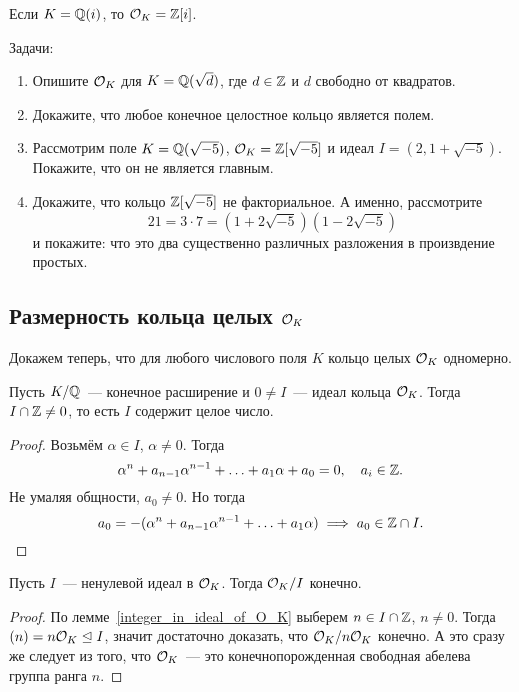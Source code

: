 	\begin{example}
		Если $K = \mathbb{Q}(i)$, то $\mathcal{O}_{K} = \mathbb{Z}[i]$.
	\end{example}

	\begin{homework}\label{hw_1}
		Задачи:
		\begin{enumerate}
			\item Опишите $\mathcal{O}_{K}$ для $K = \mathbb{Q}(\sqrt{d})$, где $d \in \mathbb{Z}$ и $d$ свободно от квадратов. 

			\item Докажите, что любое конечное целостное кольцо является полем. 

			\item Рассмотрим поле $K = \mathbb{Q}(\sqrt{-5})$, $\mathcal{O}_{K} = \mathbb{Z}[\sqrt{-5}]$ и идеал $I = (2, 1 + \sqrt{-5})$. Покажите, что он не является главным. 

			\item Докажите, что кольцо $\mathbb{Z}[\sqrt{-5}]$  не факториальное. А именно, рассмотрите
			\[
				21 = 3 \cdot 7 = (1 + 2\sqrt{-5})(1 - 2\sqrt{-5})
			\]
			и покажите: что это два существенно различных разложения в произвдение простых. 
		\end{enumerate}
	\end{homework}

	\subsection{Размерность кольца целых $\mathcal{O}_{K}$}

	Докажем теперь, что для любого числового поля $K$ кольцо целых $\mathcal{O}_{K}$ одномерно. 

	\begin{lemma}\label{integer_in_ideal_of_O_K} 
		Пусть $K/\mathbb{Q}$~--- конечное расширение и  $0 \neq I$~--- идеал кольца $\mathcal{O}_{K}$. Тогда $I \cap \mathbb{Z} \neq 0$, то есть $I$ содержит целое число. 
	\end{lemma}

	\begin{proof}
		Возьмём $\alpha \in I$, $\alpha \neq 0$. Тогда 
		\[
			\alpha^n + a_{n - 1} \alpha^{n - 1} + \ldots + a_{1}\alpha + a_0 = 0, \quad a_i \in \mathbb{Z}.
		\]
		Не умаляя общности, $a_0 \neq 0$. Но тогда 
		\[
			a_0 = - (\alpha^n + a_{n - 1} \alpha^{n - 1} + \ldots + a_{1}\alpha) \implies a_0 \in \mathbb{Z} \cap I.
		\]
	\end{proof}

	\begin{corollary}\label{O_K/I}
		Пусть $I$~--- ненулевой идеал в $\mathcal{O}_{K}$. Тогда $\mathcal{O}_{K}/I$ конечно. 
	\end{corollary}
	\begin{proof}
		По лемме~\ref{integer_in_ideal_of_O_K} выберем $n \in I \cap \mathbb{Z}$, $n \neq 0$. Тогда 
		$(n) = n\mathcal{O}_{K} \trianglelefteq I$, значит достаточно доказать, что $\mathcal{O}_{K}/n\mathcal{O}_{K}$ конечно. А это сразу же следует из того, что $\mathcal{O}_{K}$~--- это конечнопорожденная свободная абелева группа ранга $n$. 
	\end{proof}
	
